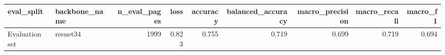 \begin{tabular}{llrrrrrrr}
\toprule
eval_split & backbone_name & n_eval_pages & loss & accuracy & balanced_accuracy & macro_precision & macro_recall & macro_f1 \\
\midrule
Evaluation set & resnet34 & 1999 & 0.823 & 0.755 & 0.719 & 0.699 & 0.719 & 0.694 \\
\bottomrule
\end{tabular}
